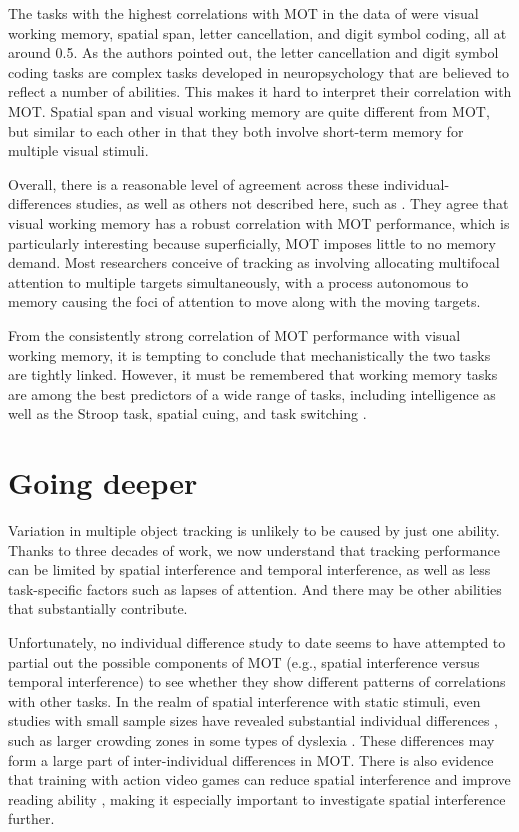\documentclass[
]{book}
\begin{document}
The tasks with the highest correlations with MOT in the data of \citet{trevinoBridgingCognitiveNeuropsychological2021} were visual working memory, spatial span, letter cancellation, and digit symbol coding, all at around 0.5. As the authors pointed out, the letter cancellation and digit symbol coding tasks are complex tasks developed in neuropsychology that are believed to reflect a number of abilities. This makes it hard to interpret their correlation with MOT. Spatial span and visual working memory are quite different from MOT, but similar to each other in that they both involve short-term memory for multiple visual stimuli.

Overall, there is a reasonable level of agreement across these individual-differences studies, as well as others not described here, such as \citet{trickSpatialVisuospatialWorking2012}. They agree that visual working memory has a robust correlation with MOT performance, which is particularly interesting because superficially, MOT imposes little to no memory demand. Most researchers conceive of tracking as involving allocating multifocal attention to multiple targets simultaneously, with a process autonomous to memory causing the foci of attention to move along with the moving targets.

From the consistently strong correlation of MOT performance with visual working memory, it is tempting to conclude that mechanistically the two tasks are tightly linked. However, it must be remembered that working memory tasks are among the best predictors of a wide range of tasks, including intelligence as well as the Stroop task, spatial cuing, and task switching \citep[e.g.][]{redickWorkingMemoryCapacity2006}.

\hypertarget{going-deeper}{%
\section{Going deeper}\label{going-deeper}}

Variation in multiple object tracking is unlikely to be caused by just one ability. Thanks to three decades of work, we now understand that tracking performance can be limited by spatial interference and temporal interference, as well as less task-specific factors such as lapses of attention. And there may be other abilities that substantially contribute.

Unfortunately, no individual difference study to date seems to have attempted to partial out the possible components of MOT (e.g., spatial interference versus temporal interference) to see whether they show different patterns of correlations with other tasks. In the realm of spatial interference with static stimuli, even studies with small sample sizes have revealed substantial individual differences \citep{petrovAsymmetriesIdiosyncraticHot2011}, such as larger crowding zones in some types of dyslexia \citep{jooOptimizingTextIndividual2018}. These differences may form a large part of inter-individual differences in MOT. There is also evidence that training with action video games can reduce spatial interference and improve reading ability \citep{bertoniExcessiveVisualCrowding2019}, making it especially important to investigate spatial interference further.
\end{document}

